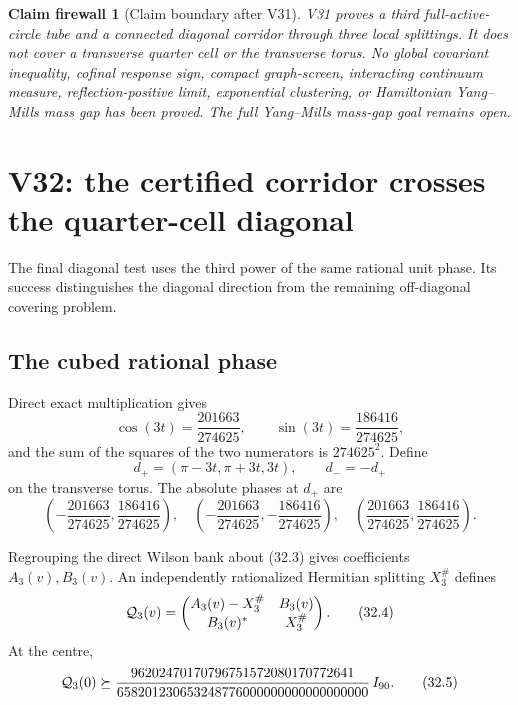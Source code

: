 \documentclass[11pt,oneside]{article}
\newtheorem{firewall}[theorem]{Claim firewall}
\theoremstyle{definition}
\theoremstyle{remark}
\begin{document}
\begin{firewall}[Claim boundary after V31]
\label{fire:newv31-final}
V31 proves a third full-active-circle tube and a connected diagonal
corridor through three local splittings.  It does not cover a
transverse quarter cell or the transverse torus.  No global
covariant inequality, cofinal response sign, compact graph-screen,
interacting continuum measure, reflection-positive limit,
exponential clustering, or Hamiltonian Yang--Mills mass gap has
been proved.  The full Yang--Mills mass-gap goal remains open.
\end{firewall}

\section{V32: the certified corridor crosses the quarter-cell diagonal}
\label{sec:newv32-diagonal-crossing}

The final diagonal test uses the third power of the same rational
unit phase.  Its success distinguishes the diagonal direction from
the remaining off-diagonal covering problem.

\subsection{The cubed rational phase}

Direct exact multiplication gives
\[
 \cos(3t)=\frac{201663}{274625},\qquad
 \sin(3t)=\frac{186416}{274625},                        \tag{32.1}
\]
and the sum of the squares of the two numerators is
\(274625^2\).  Define
\[
 d_+=(\pi-3t,\pi+3t,3t),\qquad d_-=-d_+                \tag{32.2}
\]
on the transverse torus.  The absolute phases at \(d_+\) are
\[
 \left(-\frac{201663}{274625},\frac{186416}{274625}\right),
 \quad
 \left(-\frac{201663}{274625},-\frac{186416}{274625}\right),
 \quad
 \left(\frac{201663}{274625},\frac{186416}{274625}\right).
                                                               \tag{32.3}
\]

Regrouping the direct Wilson bank about (32.3) gives coefficients
\(A_3(v),B_3(v)\).  An independently rationalized Hermitian
splitting \(X_3^\#\) defines
\[
 {\cal Q}_3(v)=
 \begin{pmatrix}
 A_3(v)-X_3^\#&B_3(v)\\
 B_3(v)^*&X_3^\#
 \end{pmatrix}.                                        \tag{32.4}
\]
At the centre,
\[
 {\cal Q}_3(0)\succeq
 \frac{96202470170796751572080170772641}
 {658201230653248776000000000000000000}\,I_{90}.       \tag{32.5}
\]
\end{document}
